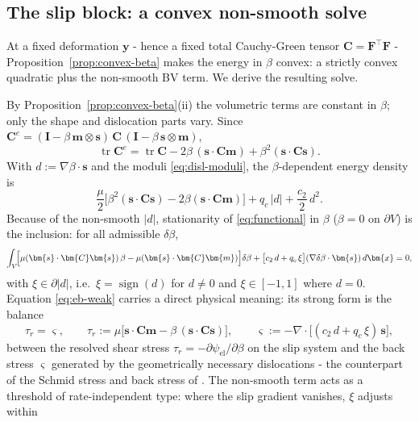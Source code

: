 \documentclass[12pt]{article}
\theoremstyle{plain}
\theoremstyle{definition}
\newcommand{\bF}{\bm{F}}
\newcommand{\bC}{\bm{C}}
\newcommand{\bs}{\bm{s}}
\newcommand{\bmm}{\bm{m}}
\newcommand{\by}{\bm{y}}
\newcommand{\bx}{\bm{x}}
\newcommand{\bI}{\bm{I}}
\newcommand{\Ce}{\bC^{e}}
\newcommand{\tr}{\operatorname{tr}}
\begin{document}
\subsection{The slip block: a convex non-smooth solve}\label{sec:blockbeta}
At a fixed deformation $\by$ - hence a fixed total Cauchy-Green tensor
$\bC=\bF^{\!\top}\bF$ - Proposition~\ref{prop:convex-beta} makes the energy in
$\beta$ convex: a strictly convex quadratic plus the non-smooth BV term. We
derive the resulting solve.

By Proposition~\ref{prop:convex-beta}(ii) the volumetric terms are constant in
$\beta$; only the shape and dislocation parts vary. Since
$\Ce=(\bI-\beta\,\bmm\otimes\bs)\,\bC\,(\bI-\beta\,\bs\otimes\bmm)$,
\begin{equation}\label{eq:trCe}
  \tr\Ce=\tr\bC-2\beta\,(\bs\cdot\bC\bmm)+\beta^{2}(\bs\cdot\bC\bs).
\end{equation}
With $d:=\nabla\beta\cdot\bs$ and the moduli \eqref{eq:disl-moduli}, the
$\beta$-dependent energy density is
\begin{equation}\label{eq:eb-density}
  \frac{\mu}{2}\bigl[\beta^{2}(\bs\cdot\bC\bs)-2\beta(\bs\cdot\bC\bmm)\bigr]
  +q_c\,|d|+\frac{c_2}{2}\,d^{2}.
\end{equation}
Because of the non-smooth $|d|$, stationarity of \eqref{eq:functional} in $\beta$
($\beta=0$ on $\partial V$) is the inclusion: for all admissible $\delta\beta$,
\begin{equation}\label{eq:eb-weak}
  \int_{V}\!\Bigl[\mu(\bs\cdot\bC\bs)\,\beta-\mu(\bs\cdot\bC\bmm)\Bigr]\delta\beta
  +\bigl[c_2\,d+q_c\,\xi\bigr](\nabla\delta\beta\cdot\bs)\,d\bx=0,
\end{equation}
with $\xi\in\partial|d|$, i.e.\ $\xi=\operatorname{sign}(d)$ for $d\neq0$ and
$\xi\in[-1,1]$ where $d=0$.
Equation \eqref{eq:eb-weak} carries a direct physical meaning: its strong form is
the balance
\begin{equation}\label{eq:schmid}
  \tau_r=\varsigma,\qquad
  \tau_r:=\mu\bigl[\bs\cdot\bC\bmm-\beta\,(\bs\cdot\bC\bs)\bigr],\qquad
  \varsigma:=-\nabla\cdot\bigl[(c_2\,d+q_c\,\xi)\,\bs\bigr],
\end{equation}
between the resolved shear stress
$\tau_r=-\partial\psi_{\mathrm{el}}/\partial\beta$ on the slip system and the
back stress $\varsigma$ generated by the geometrically necessary dislocations -
the counterpart of the Schmid stress and back stress of
\citet{koster2015aformation}. The non-smooth term acts as a threshold of
rate-independent type: where the slip gradient vanishes, $\xi$ adjusts within
\end{document}
